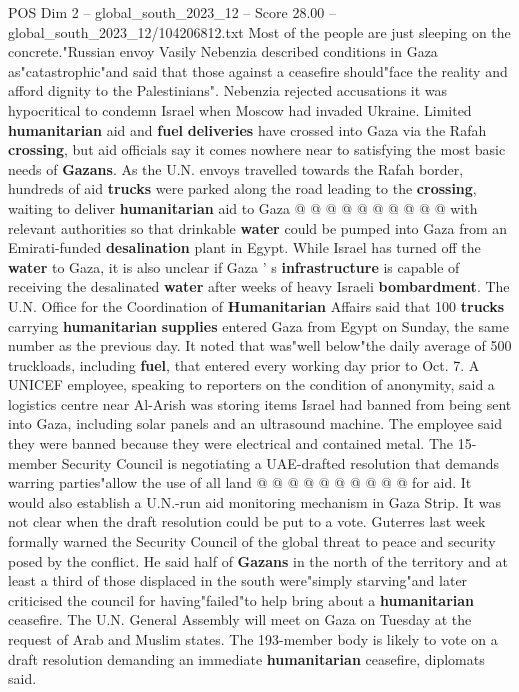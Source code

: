 \begin{textsample}{POS Dim 2 – global\_south\_2023\_12 – Score 28.00 – global\_south\_2023\_12/104206812.txt}
Most of the people are just sleeping on the concrete."Russian envoy Vasily Nebenzia described conditions in Gaza as"catastrophic"and said that those against a ceasefire should"face the reality and afford dignity to the Palestinians".
Nebenzia rejected accusations it was hypocritical to condemn Israel when Moscow had invaded Ukraine.
Limited \textbf{humanitarian} aid and \textbf{fuel} \textbf{deliveries} have crossed into Gaza via the Rafah \textbf{crossing}, but aid officials say it comes nowhere near to satisfying the most basic needs of \textbf{Gazans}.
As the U.N. envoys travelled towards the Rafah border, hundreds of aid \textbf{trucks} were parked along the road leading to the \textbf{crossing}, waiting to deliver \textbf{humanitarian} aid to Gaza @ @ @ @ @ @ @ @ @ @ with relevant authorities so that drinkable \textbf{water} could be pumped into Gaza from an Emirati-funded \textbf{desalination} plant in Egypt.
While Israel has turned off the \textbf{water} to Gaza, it is also unclear if Gaza ' s \textbf{infrastructure} is capable of receiving the desalinated \textbf{water} after weeks of heavy Israeli \textbf{bombardment}.
The U.N.
Office for the Coordination of \textbf{Humanitarian} Affairs said that 100 \textbf{trucks} carrying \textbf{humanitarian} \textbf{supplies} entered Gaza from Egypt on Sunday, the same number as the previous day.
It noted that was"well below"the daily average of 500 truckloads, including \textbf{fuel}, that entered every working day prior to Oct. 7.
A UNICEF employee, speaking to reporters on the condition of anonymity, said a logistics centre near Al-Arish was storing items Israel had banned from being sent into Gaza, including solar panels and an ultrasound machine.
The employee said they were banned because they were electrical and contained metal.
The 15-member Security Council is negotiating a UAE-drafted resolution that demands warring parties"allow the use of all land @ @ @ @ @ @ @ @ @ @ for aid.
It would also establish a U.N.-run aid monitoring mechanism in Gaza Strip.
It was not clear when the draft resolution could be put to a vote.
Guterres last week formally warned the Security Council of the global threat to peace and security posed by the conflict.
He said half of \textbf{Gazans} in the north of the territory and at least a third of those displaced in the south were"simply starving"and later criticised the council for having"failed"to help bring about a \textbf{humanitarian} ceasefire.
The U.N.
General Assembly will meet on Gaza on Tuesday at the request of Arab and Muslim states.
The 193-member body is likely to vote on a draft resolution demanding an immediate \textbf{humanitarian} ceasefire, diplomats said.

\end{textsample}
